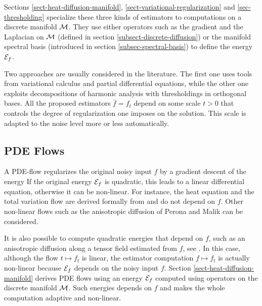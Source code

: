 \documentclass[final]{siamltex}
\newcommand{\heat}{\text{h}}
\newcommand{\F}{f}
\begin{document}
Sections \ref{sect-heat-diffusion-manifold}, \ref{sect-variational-regularization} and \ref{sec-thresholding} specialize these three kinds of estimators to computations on a discrete manifold $\mathcal{M}$. They use either operators such as the gradient and the Laplacian on $\mathcal{M}$ (defined in section \ref{subsect-discrete-diffusion}) or the manifold spectral basis (introduced in section \ref{subsec-spectral-basis}) to define the energy $\energy_{\F}$. 

Two approaches are usually considered in the literature. The first one uses tools from variational calculus and partial differential equations, while the other one exploits decompositions of harmonic analysis with thresholdings in orthogonal bases. All the proposed estimators $\bar f = \F_t$ depend on some scale $t>0$ that controls the degree of regularization one imposes on the solution. This scale is adapted to the noise level more or less automatically.


\subsection{PDE Flows}
\label{subsect-pde-flows}

A PDE-flow regularizes the original noisy input $\F$ by a gradient descent of the energy
\eql{\label{eq-pde-flow}
	\foralls t>0, \quad \pd{\F_t}{t} = - \text{grad}_{\F_t} (\energy_{\F})
	\qqwithqq \F_0=\F.
}
If the original energy $\energy_{\F}$ is quadratic, this leads to a linear differential equation, otherwise it can be non-linear. For instance, the heat equation and the total variation flow are derived formally from 
\eq{
	\energy_{\F}(f) = 
	\choice{
		\frac{1}{2} \int |\nabla_x f|^2 \d x,\\
		\int |\nabla_x f| \d x
	}
	\qarrq
	\pd{\F_t^{\heat}}{t}(x) =
	\choice{
		\Delta \F_t\\
		\div\pa{ \frac{\nabla \F_t}{\norm{\nabla \F_t}} }
	}
}
and do not depend on $\F$. Other non-linear flows such as the anisotropic diffusion of Perona and Malik \cite{perona-anisotropic} can be considered. 

It is also possible to compute quadratic energies that depend on $\F$, such as an anisotropic diffusion along a tensor field estimated from $\F$, see \cite{weickert-coherence}. In this case, although the flow $t \mapsto \F_t$ is linear, the estimator computation $\F \mapsto \F_t$ is actually non-linear because $\energy_{\F}$ depends on the noisy input $\F$. Section \ref{sect-heat-diffusion-manifold} derives PDE flows using an energy $\energy_{\F}$ computed using operators on the discrete manifold $\mathcal{M}$. Such energies depends on $\F$ and makes the whole computation adaptive and non-linear.
\end{document}
